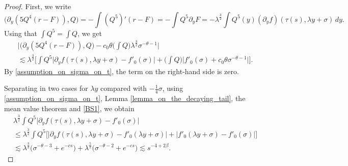 \documentclass[16pt,english, oneside,reqno]{smfart}
\begin{document}
\begin{proof}
First, we write
\begin{equation}
        \big( \partial_y(5Q^4 (r-F)), Q \big) = -\int (Q^5)' (r-F) = - \int Q^5 \partial_y F = -\lambda^{\frac{3}{2}} \int Q^{5}(y) (\partial_y f)(\tau(s),\lambda y + \sigma)\,dy.
\end{equation}
Using that $\int Q^5 = \int Q$, we get
\begin{equation}
\begin{split}
    & \bigg\lvert \big( \partial_y(5Q^4(r-F)), Q\big) - c_0 \theta \Big(\int Q\Big)\lambda^{\frac{3}{2}}\sigma^{-\theta-1} \bigg\rvert \\
    & \lesssim \lambda^{\frac{3}{2}} \bigg[ \int Q^5 \big\lvert\partial_y f(\tau(s),\lambda y +\sigma) - f'_{0}(\sigma)\big\rvert +\Big( \int Q \Big)\big\lvert f'_0(\sigma)+ c_0\theta \sigma^{-\theta-1} \big\rvert \bigg].
\end{split}
\end{equation}
By \eqref{assumption_on_sigma_on_t}, the term on the right-hand side is zero.

Separating in two cases for $\lambda y $ compared with $-\frac{1}{4}\sigma$, using \eqref{assumption_on_sigma_on_t}, Lemma \ref{lemma_on_the_decaying_tail}, the mean value theorem and \eqref{BS1}, we obtain
\begin{equation}
    \begin{split}
        &\lambda^{\frac{3}{2}}\int Q^5 \big\lvert \partial_y f(\tau(s),\lambda y +\sigma) -f'_0(\sigma) \big\rvert\\
        & \leq \lambda^{\frac{3}{2}}\int Q^5 \Big[ \big\lvert \partial_y f(\tau(s),\lambda y +\sigma) - f'_0(\lambda y+\sigma) \big\rvert + \big\lvert f'_0(\lambda y +\sigma) - f'_0(\sigma)\big\rvert \Big]\\
        & \lesssim \lambda^{\frac{3}{2}} \big( \sigma^{-\theta-3} + e^{-cs} \big) + \lambda^{\frac{5}{2}}\big( \sigma^{-\theta-2}+e^{-cs} \big)
        \lesssim s^{-4+2\beta}.
    \end{split}
\end{equation}

    
\end{proof}
\end{document}

